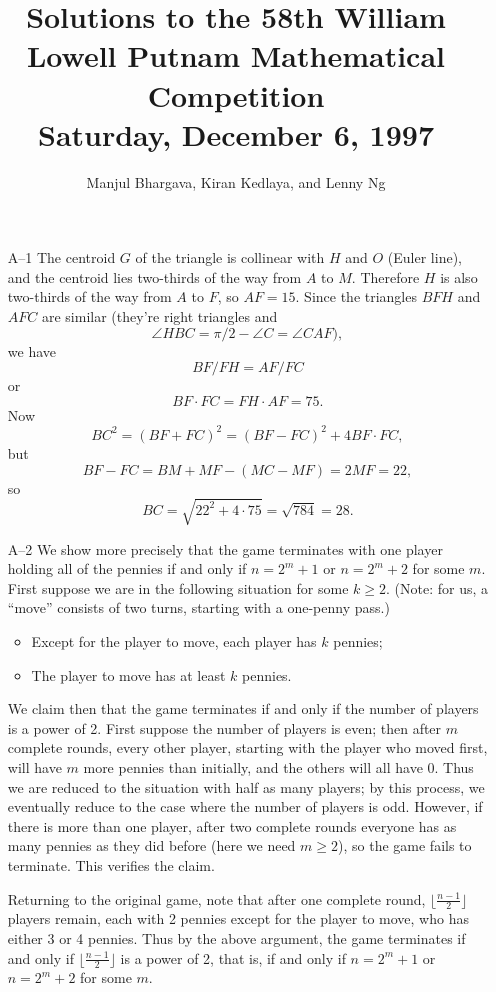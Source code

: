 \documentclass[amssymb,twocolumn,pra,10pt,aps]{revtex4-1}
\begin{document}
\title{Solutions to the 58th William Lowell Putnam Mathematical Competition \\
    Saturday, December 6, 1997}
\author{Manjul Bhargava, Kiran Kedlaya, and Lenny Ng}
\noaffiliation
\maketitle

\begin{itemize}
\item[A--1]
The centroid $G$ of the triangle is collinear with $H$ and $O$
(Euler line), and the centroid lies two-thirds of the way from $A$ to
$M$. Therefore $H$ is also two-thirds of the way from $A$ to $F$, so
$AF = 15$. Since the triangles $BFH$ and $AFC$ are similar (they're
right triangles and
\[
\angle HBC = \pi/2 - \angle C = \angle CAF),
\]
we have
\[
BF/FH = AF/FC
\]
or
\[
BF \cdot FC = FH \cdot AF = 75.
\]
Now
\[
BC^2 = (BF + FC)^2 = (BF - FC)^2 + 4 BF \cdot FC,
\]
but
\[
BF - FC = BM+MF-(MC-MF) = 2MF = 22,
\]
so
\[
BC = \sqrt{22^2 + 4 \cdot 75} = \sqrt{784} = 28.
\]

\item[A--2]
We show more precisely that the game terminates with one player
holding all of the pennies if and only if $n = 2^m + 1$ or $n = 2^m +
2$ for some $m$. First suppose we are in the following situation for
some $k \geq 2$. (Note: for us, a ``move'' consists of two turns,
starting with a one-penny pass.)
\begin{itemize}
\item
Except for the player to move, each player has $k$ pennies;
\item
The player to move has at least $k$ pennies.
\end{itemize}
We claim then that
the game terminates if and only if the number of players is a
power of 2. First suppose the number of players is even; then after
$m$ complete rounds, every other player, starting with the player who
moved first, will have $m$ more pennies than initially, and the others
will all have 0. Thus we are reduced to the situation with half as
many players; by this process, we eventually reduce to the case where
the number of players is odd. However, if there is more than one
player, after two complete rounds everyone has as many pennies as they
did before (here we need $m \geq 2$), so the game fails to terminate.
This verifies the claim.

Returning to the original game, note that after one complete round,
$\lfloor \frac{n-1}{2} \rfloor$ players remain, each with 2 pennies
except for the player to move, who has
either 3 or 4 pennies. Thus by the above argument, the game terminates
if and only if $\lfloor \frac{n-1}{2} \rfloor$ is a power of 2, that
is, if and only if $n = 2^m + 1$ or $n = 2^m + 2$ for some $m$.


\end{itemize}
\end{document}
